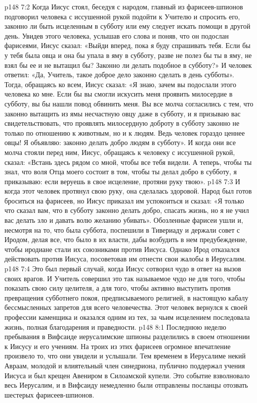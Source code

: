 \vs p148 7:2 Когда Иисус стоял, беседуя с народом, главный из фарисеев\hyp{}шпионов подговорил человека с иссушенной рукой подойти к Учителю и спросить его, законно ли быть исцеленным в субботу или ему следует искать помощи в другой день. Увидев этого человека, услышав его слова и поняв, что он подослан фарисеями, Иисус сказал: «Выйди вперед, пока я буду спрашивать тебя. Если бы у тебя была овца и она бы упала в яму в субботу, разве не полез бы ты в яму, не взял бы ее и не вытащил бы? Законно ли делать подобное в субботу?» И человек ответил: «Да, Учитель, такое доброе дело законно сделать в день субботы». Тогда, обращаясь ко всем, Иисус сказал: «Я знаю, зачем вы подослали этого человека ко мне. Если бы вы смогли искусить меня проявить милосердие в субботу, вы бы нашли повод обвинить меня. Вы все молча согласились с тем, что законно вытащить из ямы несчастную овцу даже в субботу, и я призываю вас свидетельствовать, что проявлять милосердную доброту в субботу законно не только по отношению к животным, но и к людям. Ведь человек гораздо ценнее овцы! Я объявляю: законно делать добро людям в субботу». И когда они все молча стояли перед ним, Иисус, обращаясь к человеку с иссушенной рукой, сказал: «Встань здесь рядом со мной, чтобы все тебя видели. А теперь, чтобы ты знал, что воля Отца моего состоит в том, чтобы ты делал добро в субботу, я приказываю: если веруешь в свое исцеление, протяни руку твою».
\vs p148 7:3 И когда этот человек протянул свою руку, она сделалась здоровой. Народ был готов броситься на фарисеев, но Иисус приказал им успокоиться и сказал: «Я только что сказал вам, что в субботу законно делать добро, спасать жизнь, но я не учил вас делать зло и давать волю желанию убивать». Обозленные фарисеи ушли и, несмотря на то, что была суббота, поспешили в Тивериаду и держали совет с Иродом, делая все, что было в их власти, дабы возбудить в нем предубеждение, чтобы иродиане стали их союзниками против Иисуса. Однако Ирод отказался действовать против Иисуса, посоветовав им отнести свои жалобы в Иерусалим.
\vs p148 7:4 Это был первый случай, когда Иисус сотворил чудо в ответ на вызов своих врагов. И Учитель совершил это так называемое чудо не для того, чтобы показать свою силу целителя, а для того, чтобы активно выступить против превращения субботнего покоя, предписываемого религией, в настоящую кабалу бессмысленных запретов для всего человечества. Этот человек вернулся к своей профессии каменщика и оказался одним из тех, за чьим исцелением последовала жизнь, полная благодарения и праведности.
\vs p148 8:1 Последнюю неделю пребывания в Вифсаиде иерусалимские шпионы разделились в своем отношении к Иисусу и его учениям. На троих из этих фарисеев огромное впечатление произвело то, что они увидели и услышали. Тем временем в Иерусалиме некий Авраам, молодой и влиятельный член синедриона, публично поддержал учения Иисуса и был крещен Авениром в Силоамской купели. Это событие взволновало весь Иерусалим, и в Вифсаиду немедленно были отправлены посланцы отозвать шестерых фарисеев\hyp{}шпионов.
